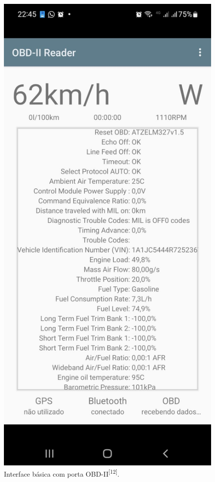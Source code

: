     \begin{figure}[hp]
    \centering
    
    \includegraphics[scale=0.3]{figures/obd2.jpg}
    
    \caption{Interface básica com porta OBD-II\textsuperscript{[12]}.}
    
    \label{fig:obd2_plataforma}
\end{figure}
    
